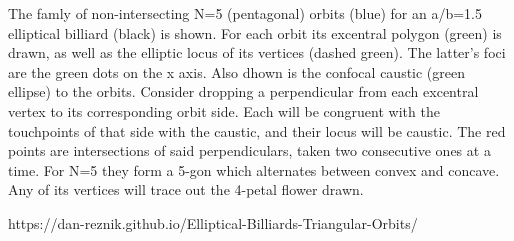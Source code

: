 The famly of non-intersecting N=5 (pentagonal) orbits (blue) for an a/b=1.5 elliptical billiard (black) is shown. For each orbit its excentral polygon (green) is drawn, as well as the elliptic locus of its vertices (dashed green). The latter's foci are the green dots on the x axis. Also dhown is the confocal caustic (green ellipse) to the orbits. Consider dropping a perpendicular from each excentral vertex to its corresponding orbit side. Each will be congruent with the touchpoints of that side with the caustic, and their locus will be caustic. The red points are intersections of said perpendiculars, taken two consecutive ones at a time. For N=5 they form a 5-gon which alternates between convex and concave. Any of its vertices will trace out the 4-petal flower drawn.

https://dan-reznik.github.io/Elliptical-Billiards-Triangular-Orbits/